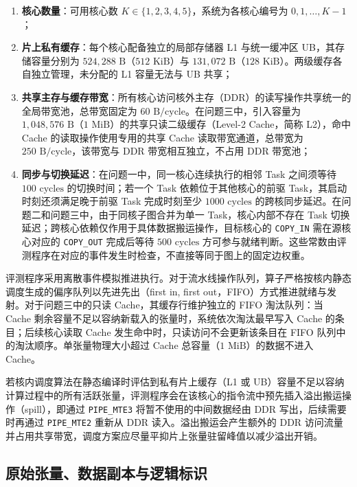 \documentclass[anonymous,notoc]{gmcm2026}
\providecommand{\tightlist}{\setlength{\itemsep}{0pt}\setlength{\parskip}{0pt}}
\begin{document}
\begin{enumerate}
\def\labelenumi{\arabic{enumi}.}
\tightlist
\item
  \textbf{核心数量}：可用核心数 \(K \in \{1, 2, 3, 4, 5\}\)，系统为各核心编号为 \(0, 1, \dots, K-1\)；
\item
  \textbf{片上私有缓存}：每个核心配备独立的局部存储器 L1 与统一缓冲区 UB，其存储容量分别为 \(524{,}288\text{ B}\)（\(512\text{ KiB}\)）与 \(131{,}072\text{ B}\)（\(128\text{ KiB}\)）。两级缓存各自独立管理，未分配的 L1 容量无法与 UB 共享；
\item
  \textbf{共享主存与缓存带宽}：所有核心访问核外主存（DDR）的读写操作共享统一的全局带宽池，总带宽固定为 \(60\text{ B/cycle}\)。在问题三中，引入容量为 \(1{,}048{,}576\text{ B}\)（\(1\text{ MiB}\)）的共享只读二级缓存（Level-2 Cache，简称 L2），命中 Cache 的读取操作使用专用的共享 Cache 读取带宽通道，总带宽为 \(250\text{ B/cycle}\)，该带宽与 DDR 带宽相互独立，不占用 DDR 带宽池；
\item
  \textbf{同步与切换延迟}：在问题一中，同一核心连续执行的相邻 Task 之间须等待 \(100\text{ cycles}\) 的切换时间；若一个 Task 依赖位于其他核心的前驱 Task，其启动时刻还须满足晚于前驱 Task 完成时刻至少 \(1000\text{ cycles}\) 的跨核同步延迟。在问题二和问题三中，由于同核子图合并为单一 Task，核心内部不存在 Task 切换延迟；跨核心依赖仅作用于具体数据搬运操作，目标核心的 \texttt{COPY\_IN} 需在源核心对应的 \texttt{COPY\_OUT} 完成后等待 \(500\text{ cycles}\) 方可参与就绪判断。这些常数由评测程序在对应的事件发生时检查，不直接等同于图上的固定边权重。
\end{enumerate}

评测程序采用离散事件模拟推进执行。对于流水线操作队列，算子严格按核内静态调度生成的偏序队列以先进先出（first in, first out，FIFO）方式推进就绪与发射。对于问题三中的只读 Cache，其缓存行维护独立的 FIFO 淘汰队列：当 Cache 剩余容量不足以容纳新载入的张量时，系统依次淘汰最早写入 Cache 的条目；后续核心读取 Cache 发生命中时，只读访问不会更新该条目在 FIFO 队列中的淘汰顺序。单张量物理大小超过 Cache 总容量（\(1\text{ MiB}\)）的数据不进入 Cache。

若核内调度算法在静态编译时评估到私有片上缓存（L1 或 UB）容量不足以容纳计算过程中的所有活跃张量，评测程序会在该核心的指令流中预先插入溢出搬运操作（spill），即通过 \texttt{PIPE\_MTE3} 将暂不使用的中间数据经由 DDR 写出，后续需要时再通过 \texttt{PIPE\_MTE2} 重新从 DDR 读入。溢出搬运会产生额外的 DDR 访问流量并占用共享带宽，调度方案应尽量平抑片上张量驻留峰值以减少溢出开销。

\subsection{原始张量、数据副本与逻辑标识}
\end{document}
